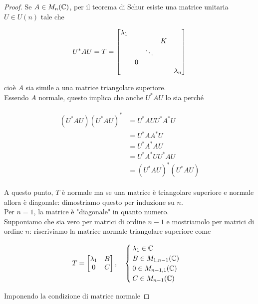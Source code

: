 \begin{proof}
	Se $ A \in M_{n}(\mathbb{C}) $, per il teorema di Schur esiste una matrice unitaria $ U \in U(n) $ tale che
	
	\begin{equation}
		U^{*} A U = T = %
		\bmqty{ %
				\dmat{ %
						\lambda_{1},
						& & K \\ & \ddots & \\ 0 & & ,
						\lambda_{n}
						}
				}
	\end{equation}

	cioè $ A $ sia simile a una matrice triangolare superiore.\\
	Essendo $ A $ normale, questo implica che anche $ U^{*} A U $ lo sia perché
	
	\begin{align}
		\begin{split}
			(U^{*} A U) (U^{*} A U)^{*} &= U^{*} A U U^{*} A^{*} U \\
			&= U^{*} A A^{*} U \\
			&= U^{*} A^{*} A U \\
			&= U^{*} A^{*} U U^{*} A U \\
			&= (U^{*} A U)^{*} (U^{*} A U)
		\end{split}
	\end{align}

	A questo punto, $ T $ è normale ma se una matrice è triangolare superiore e normale allora è diagonale: dimostriamo questo per induzione su $ n $.\\
	Per $ n=1 $, la matrice è "diagonale" in quanto numero.\\
	Supponiamo che sia vero per matrici di ordine $ n-1 $ e mostriamolo per matrici di ordine $ n $: riscriviamo la matrice normale triangolare superiore come
	
	\begin{equation}
		T = \bmqty{ \lambda_{1} & B \\ 0 & C } \qcomma %
		\begin{cases}
			\lambda_{1} \in \C \\
			B \in M_{1,n-1}(\C) \\
			0 \in M_{n-1,1}(\C) \\
			C \in M_{n-1}(\C)
		\end{cases}
	\end{equation}

	Imponendo la condizione di matrice normale
	

\end{proof}
